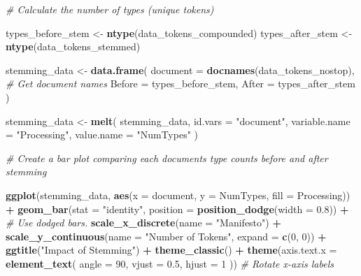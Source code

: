 \documentclass[
]{book}
\newenvironment{Shaded}{\begin{snugshade}}{\end{snugshade}}
\newcommand{\AttributeTok}[1]{\textcolor[rgb]{0.13,0.29,0.53}{#1}}
\newcommand{\CommentTok}[1]{\textcolor[rgb]{0.56,0.35,0.01}{\textit{#1}}}
\newcommand{\DecValTok}[1]{\textcolor[rgb]{0.00,0.00,0.81}{#1}}
\newcommand{\FloatTok}[1]{\textcolor[rgb]{0.00,0.00,0.81}{#1}}
\newcommand{\FunctionTok}[1]{\textcolor[rgb]{0.13,0.29,0.53}{\textbf{#1}}}
\newcommand{\NormalTok}[1]{#1}
\newcommand{\OtherTok}[1]{\textcolor[rgb]{0.56,0.35,0.01}{#1}}
\newcommand{\SpecialCharTok}[1]{\textcolor[rgb]{0.81,0.36,0.00}{\textbf{#1}}}
\newcommand{\StringTok}[1]{\textcolor[rgb]{0.31,0.60,0.02}{#1}}
\begin{document}
\begin{Shaded}
\begin{Highlighting}[]
\CommentTok{\# Calculate the number of types (unique tokens)}

\NormalTok{types\_before\_stem }\OtherTok{\textless{}{-}} \FunctionTok{ntype}\NormalTok{(data\_tokens\_compounded)}
\NormalTok{types\_after\_stem }\OtherTok{\textless{}{-}} \FunctionTok{ntype}\NormalTok{(data\_tokens\_stemmed)}

\NormalTok{stemming\_data }\OtherTok{\textless{}{-}} \FunctionTok{data.frame}\NormalTok{(}
  \AttributeTok{document =} \FunctionTok{docnames}\NormalTok{(data\_tokens\_nostop),}
  \CommentTok{\# Get document names}
  \AttributeTok{Before =}\NormalTok{ types\_before\_stem,}
  \AttributeTok{After =}\NormalTok{ types\_after\_stem}
\NormalTok{)}

\NormalTok{stemming\_data }\OtherTok{\textless{}{-}} \FunctionTok{melt}\NormalTok{(}
\NormalTok{  stemming\_data,}
  \AttributeTok{id.vars =} \StringTok{"document"}\NormalTok{,}
  \AttributeTok{variable.name =} \StringTok{"Processing"}\NormalTok{,}
  \AttributeTok{value.name =} \StringTok{"NumTypes"}
\NormalTok{)}

\CommentTok{\# Create a bar plot comparing each document\textquotesingle{}s type counts before and after stemming}

\FunctionTok{ggplot}\NormalTok{(stemming\_data, }\FunctionTok{aes}\NormalTok{(}\AttributeTok{x =}\NormalTok{ document, }\AttributeTok{y =}\NormalTok{ NumTypes, }\AttributeTok{fill =}\NormalTok{ Processing)) }\SpecialCharTok{+}
  \FunctionTok{geom\_bar}\NormalTok{(}\AttributeTok{stat =} \StringTok{"identity"}\NormalTok{, }\AttributeTok{position =} \FunctionTok{position\_dodge}\NormalTok{(}\AttributeTok{width =} \FloatTok{0.8}\NormalTok{)) }\SpecialCharTok{+} \CommentTok{\# Use dodged bars.}
  \FunctionTok{scale\_x\_discrete}\NormalTok{(}\AttributeTok{name =} \StringTok{"Manifesto"}\NormalTok{) }\SpecialCharTok{+}
  \FunctionTok{scale\_y\_continuous}\NormalTok{(}\AttributeTok{name =} \StringTok{"Number of Tokens"}\NormalTok{, }\AttributeTok{expand =} \FunctionTok{c}\NormalTok{(}\DecValTok{0}\NormalTok{, }\DecValTok{0}\NormalTok{)) }\SpecialCharTok{+}
  \FunctionTok{ggtitle}\NormalTok{(}\StringTok{"Impact of Stemming"}\NormalTok{) }\SpecialCharTok{+}
  \FunctionTok{theme\_classic}\NormalTok{() }\SpecialCharTok{+}
  \FunctionTok{theme}\NormalTok{(}\AttributeTok{axis.text.x =} \FunctionTok{element\_text}\NormalTok{(}
    \AttributeTok{angle =} \DecValTok{90}\NormalTok{,}
    \AttributeTok{vjust =} \FloatTok{0.5}\NormalTok{,}
    \AttributeTok{hjust =} \DecValTok{1}
\NormalTok{  ))  }\CommentTok{\# Rotate x{-}axis labels}
\end{Highlighting}
\end{Shaded}
\end{document}
